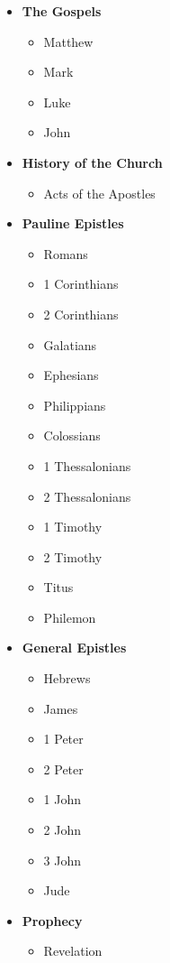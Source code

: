 \begin{multicols}{3}
\begin{itemize}[leftmargin=2em]
	\item \textbf{The Gospels}
	\begin{itemize}
		\item Matthew
		\item Mark
		\item Luke
		\item John
	\end{itemize}
	
	\item \textbf{History of the Church}
	\begin{itemize}
		\item Acts of the Apostles
	\end{itemize}
	
	\item \textbf{Pauline Epistles}
	\begin{itemize}
		\item Romans
		\item 1 Corinthians
		\item 2 Corinthians
		\item Galatians
		\item Ephesians
		\item Philippians
		\item Colossians
		\item 1 Thessalonians
		\item 2 Thessalonians
		\item 1 Timothy
		\item 2 Timothy
		\item Titus
		\item Philemon
	\end{itemize}
	
	\item \textbf{General Epistles}
	\begin{itemize}
		\item Hebrews
		\item James
		\item 1 Peter
		\item 2 Peter
		\item 1 John
		\item 2 John
		\item 3 John
		\item Jude
	\end{itemize}
	
	\item \textbf{Prophecy}
	\begin{itemize}
		\item Revelation
	\end{itemize}
\end{itemize}
\end{multicols}